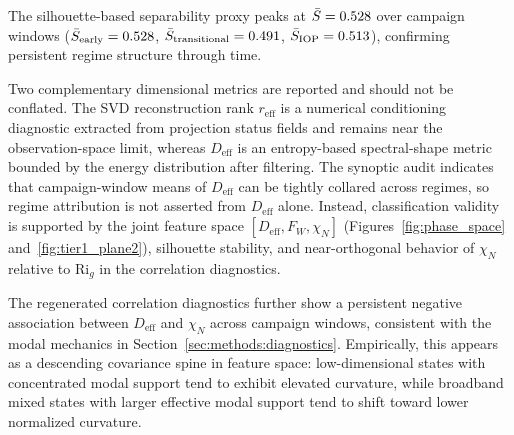 \documentclass[11pt,a4paper]{article}
\begin{document}
The silhouette-based separability proxy peaks at $\bar{S} = 0.528$ over campaign windows ($\bar{S}_{\mathrm{early}} = 0.528$, $\bar{S}_{\mathrm{transitional}} = 0.491$, $\bar{S}_{\mathrm{IOP}} = 0.513$), confirming persistent regime structure through time.

Two complementary dimensional metrics are reported and should not be conflated. The SVD reconstruction rank $r_{\mathrm{eff}}$ is a numerical conditioning diagnostic extracted from projection status fields and remains near the observation-space limit, whereas $D_{\mathrm{eff}}$ is an entropy-based spectral-shape metric bounded by the energy distribution after filtering. The synoptic audit indicates that campaign-window means of $D_{\mathrm{eff}}$ can be tightly collared across regimes, so regime attribution is not asserted from $D_{\mathrm{eff}}$ alone. Instead, classification validity is supported by the joint feature space $[D_{\mathrm{eff}}, F_W, \chi_N]$ (Figures~\ref{fig:phase_space} and~\ref{fig:tier1_plane2}), silhouette stability, and near-orthogonal behavior of $\chi_N$ relative to $\mathrm{Ri}_g$ in the correlation diagnostics.

The regenerated correlation diagnostics further show a persistent negative association between $D_{\mathrm{eff}}$ and $\chi_N$ across campaign windows, consistent with the modal mechanics in Section~\ref{sec:methods:diagnostics}. Empirically, this appears as a descending covariance spine in feature space: low-dimensional states with concentrated modal support tend to exhibit elevated curvature, while broadband mixed states with larger effective modal support tend to shift toward lower normalized curvature.

\end{document}
